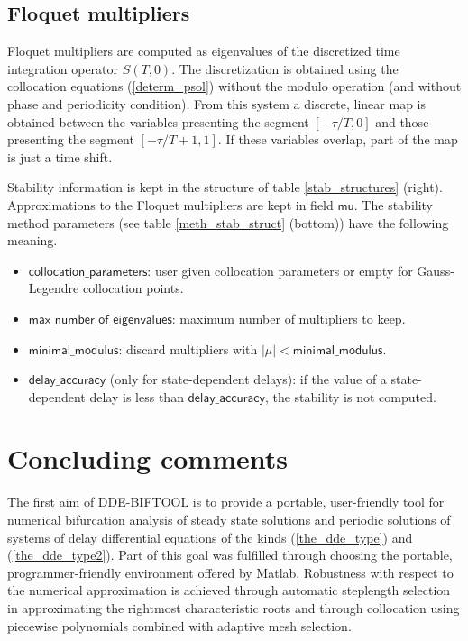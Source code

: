 \documentclass[10pt]{article}
\gdef \DDEBIFCODE{{\scshape DDE-BIFTOOL}}
\gdef \parm#1{{\mathsf{#1}}}
\begin{document}
{\subsection{Floquet multipliers}

Floquet multipliers are computed as eigenvalues of
the discretized time integration operator $S(T,0)$.
The discretization is obtained using the collocation equations 
(\ref{determ_psol}) without the modulo operation
(and without phase and periodicity condition). 
From this system a discrete, linear map is
obtained between the variables presenting the segment 
$[-\tau/T,0]$ and those presenting the segment $[-\tau/T+1,1]$.
If these variables overlap, part of the map is just a time
shift.

Stability information is kept in the structure of table \ref{stab_structures} 
(right). Approximations to the Floquet multipliers 
are kept in field $\parm{mu}$.
The stability method parameters (see table \ref{meth_stab_struct} (bottom)) 
have the following meaning. 
\begin{itemize}
\item $\parm{collocation\_parameters}$: user given
collocation parameters or empty for Gauss-Legendre collocation points.      
\item $\parm{max\_number\_of\_eigenvalues}$: maximum number of multipliers
to keep.
\item $\parm{minimal\_modulus}$: discard multipliers with
$|\mu|<\parm{minimal\_modulus}$.
\item $\parm{delay\_accuracy}$ (only for state-dependent delays): if
the value of a state-dependent delay is less than
$\parm{delay\_accuracy}$, the stability is not computed.
\end{itemize}

\section{Concluding comments}\label{limits_sec}

The first aim of {\DDEBIFCODE} is to provide a portable,
user-friendly 
tool for numerical bifurcation analysis 
of steady state solutions and periodic solutions of systems
of delay differential equations of the kinds (\ref{the_dde_type})
and (\ref{the_dde_type2}).
Part of this goal was fulfilled through choosing
the portable, programmer-friendly environment
offered by Matlab.
Robustness with respect to the numerical approximation
is achieved through automatic steplength
selection in approximating the rightmost characteristic roots
and through collocation using piecewise polynomials combined
with adaptive mesh selection.

}
\end{document}
